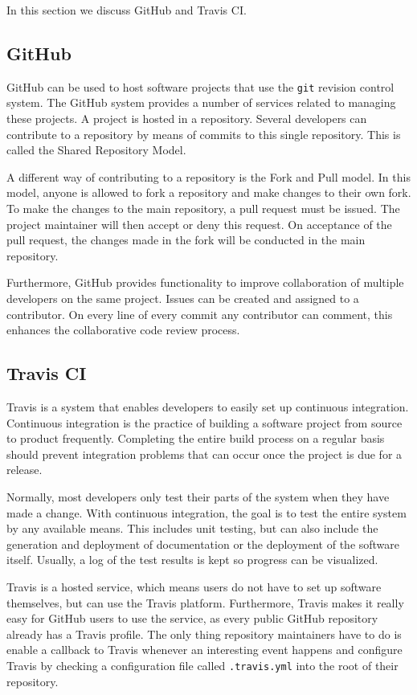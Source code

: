 In this section we discuss GitHub and Travis CI.

\subsection{GitHub}
GitHub can be used to host software projects that use the \texttt{git} revision control system. 
The GitHub system provides a number of services related to managing these projects. 
A project is hosted in a repository. 
Several developers can contribute to a repository by means of commits to this single repository.
This is called the Shared Repository Model.
 
A different way of contributing to a repository is the Fork and Pull model.
In this model, anyone is allowed to fork a repository and make changes to their own fork.
To make the changes to the main repository, a pull request must be issued.
The project maintainer will then accept or deny this request.
On acceptance of the pull request, the changes made in the fork will be conducted in the main repository.

Furthermore, GitHub provides functionality to improve collaboration of multiple developers on the same project.
Issues can be created and assigned to a contributor. 
On every line of every commit any contributor can comment, this enhances the collaborative code review process.

\subsection{Travis CI}
Travis is a system that enables developers to easily set up continuous integration.
Continuous integration is the practice of building a software project from source to product frequently.
Completing the entire build process on a regular basis should prevent integration problems that can occur once the project is due for a release.

Normally, most developers only test their parts of the system when they have made a change.
With continuous integration, the goal is to test the entire system by any available means.
This includes unit testing, but can also include the generation and deployment of documentation or the deployment of the software itself.
Usually, a log of the test results is kept so progress can be visualized.

Travis is a hosted service, which means users do not have to set up software themselves, but can use the Travis platform.
Furthermore, Travis makes it really easy for GitHub users to use the service, as every public GitHub repository already has a Travis profile.
The only thing repository maintainers have to do is enable a callback to Travis whenever an interesting event happens and configure Travis by checking a configuration file called \texttt{.travis.yml} into the root of their repository.

